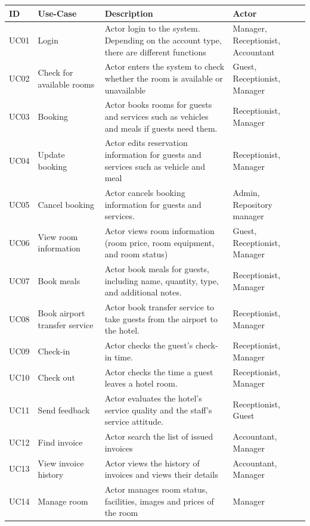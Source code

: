 \begin{table}
\begin{tabular}{|>{\raggedright\arraybackslash}p{1cm}|>{\raggedright\arraybackslash}p{3cm}|>{\raggedright\arraybackslash}p{8cm}|>{\raggedright\arraybackslash}p{3cm}|}
\hline
\textbf{ID}& \textbf{Use-Case}& \textbf{Description}& \textbf{Actor}\\
\hline
UC01& Login& Actor login to the system. Depending on the account type, there are different functions& Manager, Receptionist, Accountant \\
\hline
UC02& Check for available rooms &Actor enters the system to check whether the room is available or unavailable & Guest, Receptionist, Manager\\
\hline
UC03& Booking & Actor books rooms for guests and services such as vehicles and meals if guests need them.& Receptionist, Manager\\
\hline
UC04& Update booking&Actor edits reservation information for guests and services such as vehicle and meal & Receptionist, Manager\\
\hline
UC05& Cancel booking&Actor cancels booking information for guests and services. & Admin, Repository manager\\
\hline
UC06& View room information &Actor views room information (room price, room equipment, and room status) & Guest, Receptionist, Manager\\
\hline 
UC07& Book meals& Actor book meals for guests, including name, quantity, type, and additional notes. & Receptionist, Manager\\
\hline
UC08& Book airport transfer service& Actor book transfer service to take guests from the airport to the hotel. & Receptionist, Manager\\
\hline
UC09& Check-in & Actor checks the guest's check-in time. & Receptionist, Manager\\
\hline
UC10& Check out& Actor checks the time a guest leaves a hotel room. & Receptionist, Manager\\
\hline
UC11& Send feedback& Actor evaluates the hotel's service quality and the staff's service attitude. & Receptionist, Guest \\
\hline
UC12& Find invoice& Actor search the list of issued invoices& Accountant, Manager\\
\hline 
UC13& View invoice history& Actor views the history of invoices and views their details& Accountant, Manager\\
\hline 
UC14& Manage room& Actor manages room status, facilities, images and prices of the room& Manager\\

\end{tabular}
\end{table}
